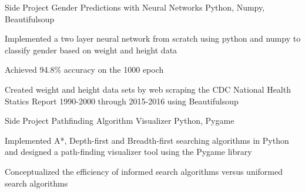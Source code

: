 \begin{cventries}
 

  \cventry
    {Side Project} %
    {Gender Predictions with Neural Networks} %
    {} %
    {\textcolor{MyBlue}{Python, Numpy, Beautifulsoup}} %
    {
      \begin{cvitems} %
        \item {Implemented a two layer neural network from scratch using python and numpy to classify gender based on weight and height data}
        \item {Achieved 94.8\% accuracy on the 1000 epoch}
        \item {Created weight and height data sets by web scraping the CDC National Health Statics Report 1990-2000 through 2015-2016 using Beautifulsoup}
      \end{cvitems}
    }
   
 


    
 

  \cventry
    {Side Project} %
    {Pathfinding Algorithm Visualizer} %
    {} %
    {\textcolor{MyBlue}{Python, Pygame}} %
    {
      \begin{cvitems} %
        \item {Implemented A*, Depth-first and Breadth-first searching algorithms in Python and designed a path-finding visualizer tool using the Pygame library}
        \item {Conceptualized the efficiency of informed search algorithms versus uniformed search algorithms}
      \end{cvitems}
    }

 

\end{cventries}
